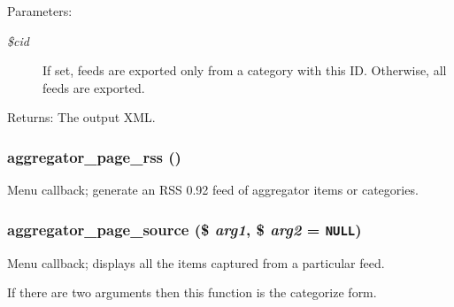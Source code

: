 \begin{Desc}
\item[Parameters:]
\begin{description}
\item[{\em \$cid}]If set, feeds are exported only from a category with this ID. Otherwise, all feeds are exported. \end{description}
\end{Desc}
\begin{Desc}
\item[Returns:]The output XML. \end{Desc}
\hypertarget{aggregator_8pages_8inc_94deaf11e3e859a3c338a74191120a37}{
\subsubsection[{aggregator\_\-page\_\-rss}]{\setlength{\rightskip}{0pt plus 5cm}aggregator\_\-page\_\-rss ()}}
\label{aggregator_8pages_8inc_94deaf11e3e859a3c338a74191120a37}


Menu callback; generate an RSS 0.92 feed of aggregator items or categories. \hypertarget{aggregator_8pages_8inc_be514d3b7eb4d9fe3c9e8cca4ae8f155}{
\subsubsection[{aggregator\_\-page\_\-source}]{\setlength{\rightskip}{0pt plus 5cm}aggregator\_\-page\_\-source (\$ {\em arg1}, \/  \$ {\em arg2} = {\tt NULL})}}
\label{aggregator_8pages_8inc_be514d3b7eb4d9fe3c9e8cca4ae8f155}


Menu callback; displays all the items captured from a particular feed.

If there are two arguments then this function is the categorize form.

